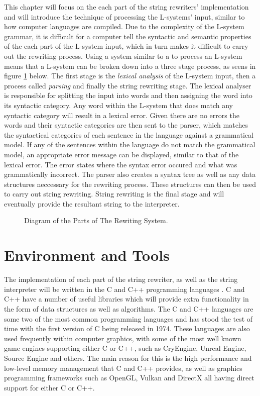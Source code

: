 This chapter will focus on the each part of the string rewriters' implementation and will introduce the technique of processing the L-systems' input, similar to how computer languages are compiled. Due to the complexity of the L-system grammar, it is difficult for a computer tell the syntactic and semantic properties of the each part of the L-system input, which in turn makes it difficult to carry out the rewriting process. Using a system similar to a  to process an L-system means that a L-system  can be broken down into a three stage process, as seens in figure \ref{3D rotations} below. The first stage is the \textit{lexical analysis} of the L-system input, then a process called \textit{parsing} and finally the string rewriting stage. The lexical analyser is responsible for splitting the input into words and then assigning the word into its syntactic category. Any word within the L-system that does match any syntactic category will result in a lexical error. Given there are no errors the words and their syntactic categories are then sent to the parser, which matches the syntactical categories of each sentence in the language against a grammatical model. If any of the sentences within the language do not match the grammatical model, an appropriate error message can be displayed, similar to that of the lexical error. The error states where the syntax error occured and what was grammatically incorrect. The parser also creates a syntax tree as well as any data structures neccessary for the rewriting process. These structures can then be used to carry out string rewriting. String rewriting is the final stage and will eventually provide the resultant string to the interpreter.

\begin{figure}[htbp]
	{\centering
		\setlength{\fboxrule}{1pt}
		\vspace{7px}
		\caption{Diagram of the Parts of The Rewiting System.} \label{3D rotations}
	}
\end{figure}
\FloatBarrier

\section{Environment and Tools}

The implementation of each part of the string rewriter, as well as the string interpreter will be written in the C and C++ programming languages \cite{stroustrup2000c++}. C and C++ have a number of useful libraries which will provide extra functionality in the form of data structures as well as algorithms. The C and C++ languages are some two of the most common programming languages and has stood the test of time with the first version of C being released in 1974. These languages are also used frequently within computer graphics, with some of the most well known game engines supporting either C or C++, such as CryEngine, Unreal Engine, Source Engine and others. The main reason for this is the high performance and low-level memory management that C and C++ provides, as well as graphics programming frameworks such as OpenGL, Vulkan and DirectX all having direct support for either C or C++. 

